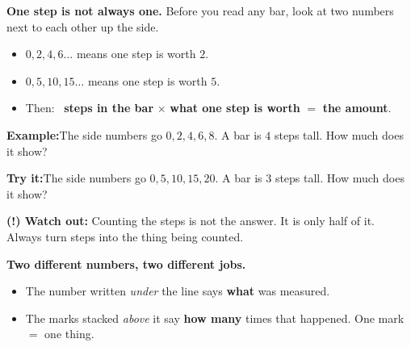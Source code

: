 \documentclass[12pt]{article}
\begin{document}


\begin{formulabox}
\textbf{One step is not always one.} Before you read any bar, look at two
numbers next to each other up the side.
\begin{itemize}[leftmargin=0.8cm, itemsep=1pt, topsep=2pt]
  \item $0, 2, 4, 6 \ldots$ means one step is worth $2$.
  \item $0, 5, 10, 15 \ldots$ means one step is worth $5$.
  \item Then: \ \textbf{steps in the bar} $\times$ \textbf{what one step is
        worth} $=$ \textbf{the amount}.
\end{itemize}
\end{formulabox}

\begin{examplebox}
\textbf{Example:}\quad The side numbers go $0, 2, 4, 6, 8$. A bar is $4$ steps
tall. How much does it show?
\end{examplebox}

\begin{tryitbox}
\textbf{Try it:}\quad The side numbers go $0, 5, 10, 15, 20$. A bar is $3$ steps
tall. How much does it show?\\[2pt]
\end{tryitbox}

\begin{watchoutbox}
\textbf{(!) Watch out:} Counting the steps is not the answer. It is only half of
it. Always turn steps into the thing being counted.
\end{watchoutbox}


\begin{formulabox}
\textbf{Two different numbers, two different jobs.}
\begin{itemize}[leftmargin=0.8cm, itemsep=1pt, topsep=2pt]
  \item The number written \emph{under} the line says \textbf{what} was measured.
  \item The marks stacked \emph{above} it say \textbf{how many} times that
        happened. One mark $=$ one thing.
\end{itemize}
\end{formulabox}
\end{document}
